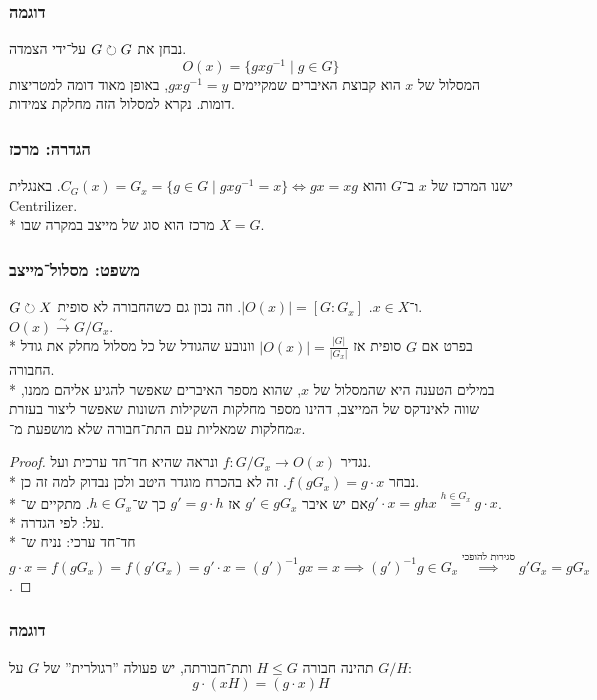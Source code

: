 \subsubsection{דוגמה}
נבחן את $G \circlearrowright G$ על־ידי הצמדה.
\[
	O(x) = \{ g x g^{-1} \mid g \in G\}
\]
המסלול של $x$ הוא קבוצת האיברים שמקיימים $g x g^{-1} = y$, באופן מאוד דומה למטריצות דומות.
נקרא למסלול הזה מחלקת צמידות.

\subsubsection{הגדרה: מרכז}
ישנו המרכז של $x$ ב־$G$ והוא $C_G(x) = G_x = \{ g \in G \mid g x g^{-1} = x\} \iff gx = xg$. באנגלית Centrilizer.\\*
מרכז הוא סוג של מייצב במקרה שבו $X = G$.

\subsubsection{משפט: מסלול־מייצב}
$G \circlearrowright X$ ו־$x \in X$. $|O(x)| = [G : G_x]$. וזה נכון גם כשהחבורה לא סופית. $O(x) \xrightarrow{\sim} G/G_x$.\\*
בפרט אם $G$ סופית אז $|O(x)| = \frac{|G|}{|G_x|}$ וונובע שהגודל של כל מסלול מחלק את גודל החבורה. \\*
במילים הטענה היא שהמסלול של $x$, שהוא מספר האיברים שאפשר להגיע אליהם ממנו, שווה לאינדקס של המייצב, דהינו מספר מחלקות השקילות השונות שאפשר ליצור בעזרת מחלקות שמאליות עם התת־חבורה שלא מושפעת מ־$x$.
\begin{proof}
	נגדיר $f : G/G_x \to O(x)$ ונראה שהיא חד־חד ערכית ועל.\\*
	נבחר $f(gG_x) = g \cdot x$. זה לא בהכרח מוגדר היטב ולכן נבדוק למה זה כן.\\*
	אם יש איבר $g' \in gG_x$ אז $g' = g \cdot h$ כך ש־$h \in G_x$. מתקיים ש־$g' \cdot x = g h x \overset{h \in G_x}{=} g \cdot x$.\\*
	על: לפי הגדרה. \\*
	חד־חד ערכי: נניח ש־$g \cdot x = f(g G_x) = f(g'G_x) = g' \cdot x = {(g')}^{-1} g x = x \implies {(g')}^{-1} g \in G_x \overset{\text{סגירות להופכי}}{\implies} g'G_x = g G_x$.
\end{proof}

\subsubsection{דוגמה}
תהינה חבורה $H \le G$ ותת־חבורתה, יש פעולה ''רגולרית'' של $G$ על $G / H$:
\[
	g \cdot (x H) = (g \cdot x) H
\]


